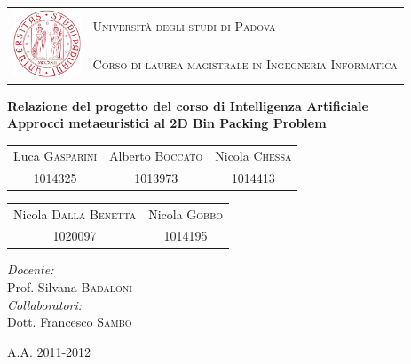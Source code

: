 \thispagestyle{empty}
\begin{center}
	\leavevmode
	\large
	\begin{tabular}{ r l }
		\multirow{2}{*}{\includegraphics[width=2cm]{img/unipd_logo.png}} & \textsc{Università degli studi di Padova}\par \\
			& \textsc{Corso di laurea magistrale in Ingegneria Informatica} \\
	\end{tabular}
	\vskip 3cm
	
	\vfill
	\textbf{{\large Relazione del progetto del corso di Intelligenza Artificiale}}\\[0.2cm]
	\textbf{{\LARGE Approcci metaeuristici al 2D Bin Packing Problem}}\par
	\vskip 3cm
	\normalfont
	
	\begin{tabular}{ c c c }
		\large Luca \textsc{Gasparini} & Alberto \textsc{Boccato} &
				Nicola \textsc{Chessa} \\
		\normalsize 1014325 & 1013973 & 1014413 \\
	\end{tabular}
	\vskip 0.5cm
	\begin{tabular}{ c c }
		\large Nicola \textsc{Dalla Benetta} & Nicola \textsc{Gobbo} \\
		\normalsize 1020097 & 1014195 \\
	\end{tabular}
	\normalfont
	\vskip 4cm
	
	\begin{flushright}
		\emph{Docente:}\\
		Prof. Silvana \textsc{Badaloni}\\
	 \vskip 2cm
		\emph{Collaboratori:}\\
		Dott. Francesco \textsc{Sambo}\\
	\end{flushright}

	
	\vfill
	{\large A.A. 2011-2012}
\end{center}
\cleardoublepage
